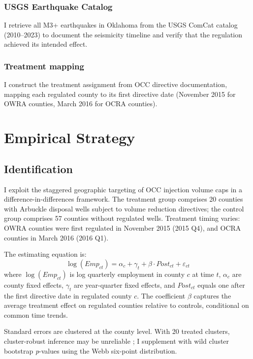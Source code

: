 \documentclass[12pt]{article}
\begin{document}
\subsubsection*{USGS Earthquake Catalog} I retrieve all M3+ earthquakes in Oklahoma from the USGS ComCat catalog (2010--2023) to document the seismicity timeline and verify that the regulation achieved its intended effect.

\subsubsection*{Treatment mapping} I construct the treatment assignment from OCC directive documentation, mapping each regulated county to its first directive date (November 2015 for OWRA counties, March 2016 for OCRA counties).




\section{Empirical Strategy}

\subsection{Identification}

I exploit the staggered geographic targeting of OCC injection volume caps in a difference-in-differences framework. The treatment group comprises 20 counties with Arbuckle disposal wells subject to volume reduction directives; the control group comprises 57 counties without regulated wells. Treatment timing varies: OWRA counties were first regulated in November 2015 (2015 Q4), and OCRA counties in March 2016 (2016 Q1).

The estimating equation is:
\begin{equation}
\log(Emp_{ct}) = \alpha_c + \gamma_t + \beta \cdot Post_{ct} + \varepsilon_{ct}
\label{eq:twfe}
\end{equation}
where $\log(Emp_{ct})$ is log quarterly employment in county $c$ at time $t$, $\alpha_c$ are county fixed effects, $\gamma_t$ are year-quarter fixed effects, and $Post_{ct}$ equals one after the first directive date in regulated county $c$. The coefficient $\beta$ captures the average treatment effect on regulated counties relative to controls, conditional on common time trends.

Standard errors are clustered at the county level. With 20 treated clusters, cluster-robust inference may be unreliable \citep{cameron2008}; I supplement with wild cluster bootstrap \emph{p}-values using the Webb six-point distribution.
\end{document}
